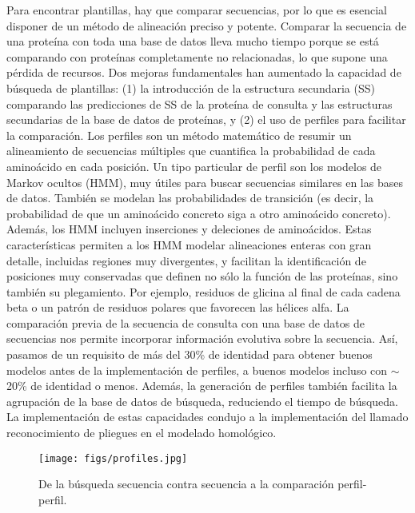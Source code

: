 Para encontrar plantillas, hay que comparar secuencias, por lo que es esencial disponer de un método de alineación preciso y potente. Comparar la secuencia de una proteína con toda una base de datos lleva mucho tiempo porque se está comparando con proteínas completamente no relacionadas, lo que supone una pérdida de recursos. Dos mejoras fundamentales han aumentado la capacidad de búsqueda de plantillas: (1) la introducción de la estructura secundaria (SS) comparando las predicciones de SS de la proteína de consulta y las estructuras secundarias de la base de datos de proteínas, y (2) el uso de perfiles para facilitar la comparación. Los perfiles son un método matemático de resumir un alineamiento de secuencias múltiples que cuantifica la probabilidad de cada aminoácido en cada posición. Un tipo particular de perfil son los modelos de Markov ocultos (HMM), muy útiles para buscar secuencias similares en las bases de datos. También se modelan las probabilidades de transición (es decir, la probabilidad de que un aminoácido concreto siga a otro aminoácido concreto). 
Además, los HMM incluyen inserciones y deleciones de aminoácidos. Estas características permiten a los HMM modelar alineaciones enteras con gran detalle, incluidas regiones muy divergentes, y facilitan la identificación de posiciones muy conservadas que definen no sólo la función de las proteínas, sino también su plegamiento. Por ejemplo, residuos de glicina al final de cada cadena beta o un patrón de residuos polares que favorecen las hélices alfa. La comparación previa de la secuencia de consulta con una base de datos de secuencias nos permite incorporar información evolutiva sobre la secuencia. Así, pasamos de un requisito de más del 30\% de identidad para obtener buenos modelos antes de la implementación de perfiles, a buenos modelos incluso con $\sim$20\% de identidad o menos. Además, la generación de perfiles también facilita la agrupación de la base de datos de búsqueda, reduciendo el tiempo de búsqueda. La implementación de estas capacidades condujo a la implementación del llamado reconocimiento de pliegues en el modelado homológico.

\begin{figure}[h]
\centering
\texttt{[image: figs/profiles.jpg]}
\caption{De la búsqueda secuencia contra secuencia a la comparación perfil-perfil.}
\end{figure}

